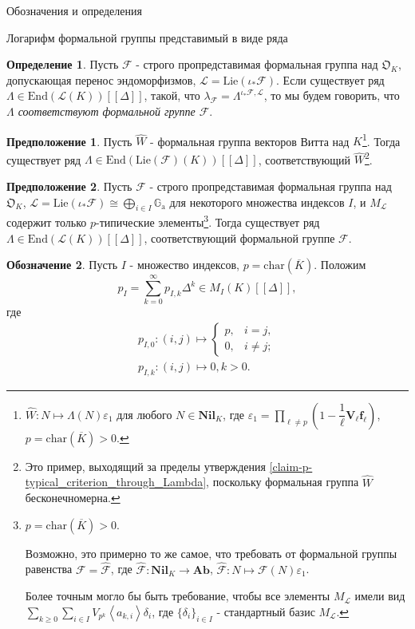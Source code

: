 \documentclass[a4paper,14pt]{extarticle}
\theoremstyle{definition}
\newtheorem{definition}{Определение}[section]
\newtheorem{denotation}[definition]{Обозначение}
\newtheorem{guess}{Предположение}
\newcommand{\Ab}{\mathbf{Ab}}
\newcommand{\End}[1]{\mathrm{End}\left(#1\right)}
\newcommand{\fchar}[1]{\mathrm{char}\left(#1\right)}
\newcommand{\Lie}[1]{\mathrm{Lie}\left(#1\right)}
\newcommand{\Nil}[1]{\mathbf{Nil}_{#1}}
\newcommand{\nat}[3]{{#1}^{{\scriptscriptstyle #2, #3 }}}
\newcommand{\bG}{\mathbb{G}}
\newcommand{\fO}{\mathfrak{O}}
\newcommand{\oH}[1]{\left\langle #1 \right\rangle}
\newcommand{\oF}{\mathbf{f}}
\newcommand{\oV}{\mathbf{V}}
\newcommand{\sF}{\mathscr{F}}
\newcommand{\sL}{\mathscr{L}}
\newcommand{\Ga}{\bG_{\mathrm{a}}}
\begin{document}
\begin{section}{Обозначения и определения}
\begin{subsection}{Логарифм формальной группы представимый в виде ряда}
\begin{definition}
    Пусть $\sF$ - строго пропредставимая формальная группа над $\fO_K$, допускающая перенос эндоморфизмов, ${ \sL = \Lie{\iota_* \sF} }$. Если существует ряд ${ \Lambda \in \End{\sL(K)}[[\Delta]] }$, такой, что ${ \lambda_\sF = \nat{\Lambda}{\iota_* \sF}{\sL} }$, то мы будем говорить, что \textit{$\Lambda$ соответствуют формальной группе $\sF$}.
\end{definition}

\begin{guess}
    Пусть $\widehat{W}$ - формальная группа векторов Витта над $K$\footnote{
        ${ \widehat{W} : N \mapsto \Lambda(N) \varepsilon_1 }$ для любого ${ N \in \Nil{K} }$, где ${ \varepsilon_1 = \prod\limits_{\ell \neq p} \left( 1 - \dfrac{1}{\ell} \oV_\ell \oF_\ell \right) }$, ${ p = \fchar{\overline{K}} > 0 }$.
    }. Тогда существует ряд ${ \Lambda \in \End{\Lie{\sF}(K)}[[\Delta]] }$, соответствующий $\widehat{W}$\footnote{
        Это пример, выходящий за пределы утверждения \ref{claim-p-typical_criterion_through_Lambda}, поскольку формальная группа $\widehat{W}$ бесконечномерна.
    }.
\end{guess}

\begin{guess}
    Пусть $\sF$ - строго пропредставимая формальная группа над $\fO_K$, ${ \sL = \Lie{\iota_* \sF} \cong \bigoplus\limits_{i \in I} \Ga }$ для некоторого множества индексов $I$, и $M_\sL$ содержит только $p$-типические элементы\footnote{
        ${ p = \fchar{\overline{K}} > 0 }$.

        Возможно, это примерно то же самое, что требовать от формальной группы равенства ${ \sF = \widehat{\sF} }$, где ${ \widehat{\sF} : \Nil{K} \rightarrow \Ab }$, ${ \widehat{\sF} : N \mapsto \sF(N) \varepsilon_1 }$.

        Более точным могло бы быть требование, чтобы все элементы $M_\sL$ имели вид ${ \sum\limits_{k \geq 0} \sum\limits_{i \in I} V_{p^k} \oH{a_{k, i}} \delta_i }$, где ${ \{ \delta_i \}_{i \in I} }$ - стандартный базис $M_\sL$.
    }. Тогда существует ряд ${ \Lambda \in \End{\sL(K)}[[\Delta]] }$, соответствующий формальной группе $\sF$.
\end{guess}

\begin{denotation}
    Пусть $I$ - множество индексов, ${ p = \fchar{\overline{K}} }$. Положим
    \begin{equation*}
        p_I =
        \sum_{k = 0}^\infty p_{I, k} \Delta^k \in
        M_I(K)[[\Delta]],
    \end{equation*}
    где
    \begin{gather*}
        p_{I, 0} : (i, j) \mapsto \begin{cases}
            p, & i = j, \\
            0, & i \neq j;
        \end{cases} \\
        p_{I, k} : (i, j) \mapsto 0, k > 0.
    \end{gather*}
\end{denotation}


\end{subsection}
\end{section}
\end{document}
